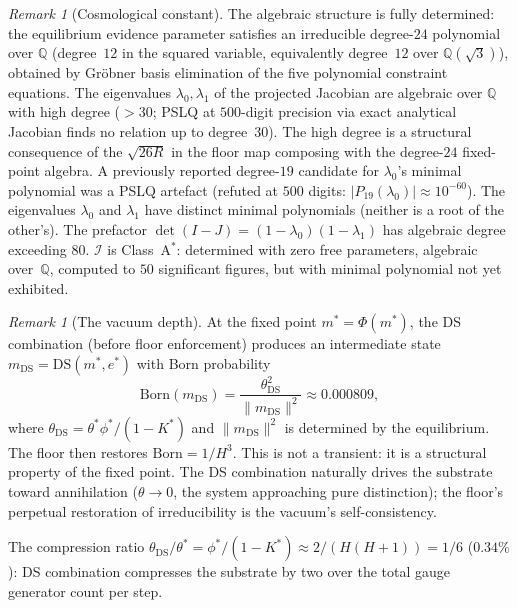 \documentclass[11pt,a4paper]{article}
\theoremstyle{definition}
\theoremstyle{remark}
\newtheorem{remark}[theorem]{Remark}
\begin{document}
\begin{remark}[Cosmological constant]
The algebraic structure is fully determined: the equilibrium evidence parameter satisfies an irreducible degree-$24$ polynomial over $\mathbb{Q}$ (degree~$12$ in the squared variable, equivalently degree~$12$ over $\mathbb{Q}(\sqrt{3})$), obtained by Gr\"obner basis elimination of the five polynomial constraint equations. The eigenvalues $\lambda_0,\lambda_1$ of the projected Jacobian are algebraic over $\mathbb{Q}$ with high degree ($>30$; PSLQ at $500$-digit precision via exact analytical Jacobian finds no relation up to degree~$30$). The high degree is a structural consequence of the $\sqrt{26R}$ in the floor map composing with the degree-$24$ fixed-point algebra. A previously reported degree-$19$ candidate for $\lambda_0$'s minimal polynomial was a PSLQ artefact (refuted at $500$ digits: $|P_{19}(\lambda_0)|\approx 10^{-60}$). The eigenvalues $\lambda_0$ and $\lambda_1$ have distinct minimal polynomials (neither is a root of the other's). The prefactor $\det(I-J)=(1-\lambda_0)(1-\lambda_1)$ has algebraic degree exceeding $80$. $\mathcal{I}$ is Class~A$^*$: determined with zero free parameters, algebraic over~$\mathbb{Q}$, computed to $50$ significant figures, but with minimal polynomial not yet exhibited.
\end{remark}

\begin{remark}[The vacuum depth]\label{rem:vacuum_depth}
At the fixed point $m^*=\Phi(m^*)$, the DS combination (before floor enforcement) produces an intermediate state $m_{\mathrm{DS}}=\mathrm{DS}(m^*,e^*)$ with Born probability
\[
\mathrm{Born}(m_{\mathrm{DS}})=\frac{\theta_{\mathrm{DS}}^2}{\|m_{\mathrm{DS}}\|^2}\approx 0.000809,
\]
where $\theta_{\mathrm{DS}}=\theta^*\phi^*/(1-K^*)$ and $\|m_{\mathrm{DS}}\|^2$ is determined by the equilibrium. The floor then restores $\mathrm{Born}=1/H^3$. This is not a transient: it is a structural property of the fixed point. The DS combination naturally drives the substrate toward annihilation ($\theta\to 0$, the system approaching pure distinction); the floor's perpetual restoration of irreducibility is the vacuum's self-consistency.

The compression ratio $\theta_{\mathrm{DS}}/\theta^*=\phi^*/(1-K^*)\approx 2/(H(H\!+\!1))=1/6$ ($0.34\%$): DS combination compresses the substrate by two over the total gauge generator count per step.
\end{remark}
\end{document}
